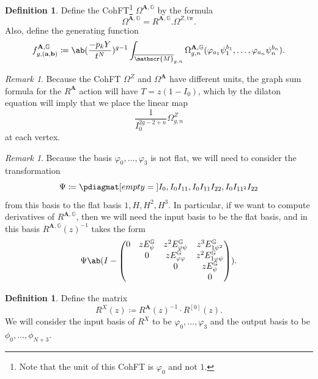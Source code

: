 \documentclass[10pt]{amsart}
\theoremstyle{definition}
\newtheorem{defn}[thm]{Definition}
\theoremstyle{remark}
\newtheorem{rmk}[thm]{Remark}
\theoremstyle{plain}
\theoremstyle{definition}
\theoremstyle{remark}
\newcommand{\G}{\mathbb{G}}
\newcommand{\ba}{\mathbf{a}}
\newcommand{\bb}{\mathbf{b}}
\newcommand{\bA}{\mathbf{A}}
\newcommand{\msc}[1]{\mathscr{#1}}
\newcommand{\mr}[1]{\mathrm{#1}}
\newcommand{\ol}[1]{\overline{#1}}
\newcommand{\1}{\mathbf{1}}
\newcommand{\2}{\mathbf{2}}
\newcommand{\3}{\mathbf{3}}
\newcommand{\tw}{\mr{tw}}
\numberwithin{equation}{section}
\begin{document}
\begin{defn}
    Define the CohFT\footnote{Note that the unit of this CohFT is $\varphi_0$ and not $1$.} $\Omega^{\bA, \G}$ by the formula
    \[ \Omega^{\bA, \G} = R^{\bA,\G}.\Omega^{Z,\tw}. \]
    Also, define the generating function
    \[ f_{g,(\ba,\bb)}^{\bA,\G} \coloneqq \ab( \frac{-p_kY}{t^N} )^{g-1} \int_{\ol{\msc{M}}_{g,n}} \Omega_{g,n}^{\bA,\G}(\varphi_{a_1} \psi_1^{b_1}, \ldots, \varphi_{a_n} \psi_n^{b_n}). \]
\end{defn}

\begin{rmk}
    Because the CohFT $\Omega^Z$ and $\Omega^{\bA}$ have different units, the graph sum formula for the $R^{\bA}$ action will have $T = z(1-I_0)$, which by the dilaton equation will imply that we place the linear map
    \[ \frac{1}{I_0^{2g-2+n}} \Omega^Z_{g,n} \]
    at each vertex.
\end{rmk}


\begin{rmk}
    Because the basis $\varphi_0, \ldots, \varphi_3$ is not flat, we will need to consider the transformation
    \[ \Psi \coloneqq \pdiagmat[empty={}]{I_0,I_0 I_{11},I_0 I_{11} I_{22},I_0I_{11^2}I_{22}} \]
    from this basis to the flat basis $1, H, H^2, H^3$. In particular, if we want to compute derivatives of $R^{\bA,\G}$, then we will need the input basis to be the flat basis, and in this basis $R^{\bA, \G}(z)^{-1}$ takes the form
    \[ \Psi \ab(I - \begin{pmatrix}
        0 & z E_{\psi}^{\G} & z^2 E_{\varphi\psi}^{\G} & z^3 E_{1\psi^2}^{\G} \\
        & 0 & z E_{\varphi\varphi}^{\G} & z^2 E_{1\varphi\psi}^{\G} \\
        & & 0 & z E_{\psi}^{\G} \\
        & & & 0
    \end{pmatrix}). \]
\end{rmk}

\begin{defn}
    Define the matrix
    \[ R^{X}(z) \coloneqq R^{\bA}(z)^{-1} \cdot R^{[0]}(z). \]
    We will consider the input basis of $R^X$ to be $\varphi_0, \ldots, \varphi_3$ and the output basis to be $\phi_0, \ldots, \phi_{N+3}$.
\end{defn}
\end{document}

